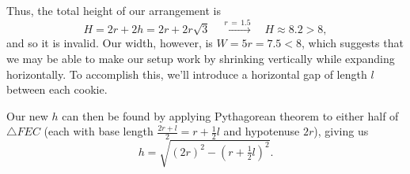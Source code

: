 \begin{solution}
    Thus, the total height of our arrangement is
    \[
        H=2r+2h=2r+2r\sqrt{3} \quad \xrightarrow{r\, =\, 1.5} \quad H \approx 8.2 > 8,
    \]
    and so it is invalid. Our width, however, is $W = 5r = 7.5<8$, which suggests that we may be able to make our setup work by shrinking vertically while expanding horizontally. To accomplish this, we'll introduce a horizontal gap of length $l$ between each cookie.
    \pagebreak
    \pgfmathsetmacro{\m}{0.5pt}                          %

    \begin{minipage}[t]{0.63\linewidth}\vspace{0pt}\raggedright
        Our new $h$ can then be found by applying Pythagorean theorem to either half of $\triangle FEC$ (each with base length $\frac{2r+l}{2}=r+\frac{1}{2}l$ and hypotenuse $2r$), giving us
    \[
        h=\sqrt{(2r)^2-\left(r+\tfrac{1}{2}l\right)^{2}}.
    \]
    \end{minipage}
    \begin{minipage}[t]{0.35\linewidth}\vspace{0pt}\centering
\end{minipage}
\end{solution}
